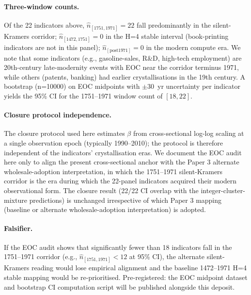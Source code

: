 \paragraph{Three-window counts.} Of the 22 indicators above, $\hat{n}_{[1751,1971]} = 22$ fall predominantly in the silent-Kramers corridor; $\hat{n}_{[1472,1751]} = 0$ in the H=4 stable interval (book-printing indicators are not in this panel); $\hat{n}_{[\text{post}1971]} = 0$ in the modern compute era. We note that some indicators (e.g., gasoline-sales, R\&D, high-tech employment) are 20th-century late-modernity events with EOC near the corridor terminus 1971, while others (patents, banking) had earlier crystallisations in the 19th century. A bootstrap (n=10000) on EOC midpoints with $\pm 30$~yr uncertainty per indicator yields the 95\% CI for the 1751--1971 window count of $[18, 22]$.

\paragraph{Closure protocol independence.} The closure protocol used here estimates $\beta$ from cross-sectional log-log scaling at a single observation epoch (typically 1990--2010); the protocol is therefore independent of the indicators' crystallisation eras. We document the EOC audit here only to align the present cross-sectional anchor with the Paper 3 alternate wholesale-adoption interpretation, in which the 1751--1971 silent-Kramers corridor is the era during which the 22-panel indicators acquired their modern observational form. The closure result (22/22 CI overlap with the integer-cluster-mixture predictions) is unchanged irrespective of which Paper 3 mapping (baseline or alternate wholesale-adoption interpretation) is adopted.

\paragraph{Falsifier.} If the EOC audit shows that significantly fewer than 18 indicators fall in the 1751--1971 corridor (e.g., $\hat{n}_{[1751,1971]} < 12$ at 95\% CI), the alternate silent-Kramers reading would lose empirical alignment and the baseline 1472--1971 H=4 stable mapping would be re-prioritised. Pre-registered: the EOC midpoint dataset and bootstrap CI computation script will be published alongside this deposit.







